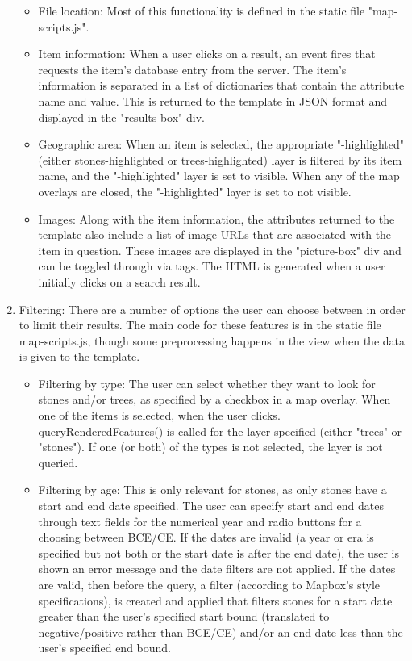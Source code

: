 \documentclass[]{article}
\begin{document}
\begin{enumerate}
		\begin{itemize}
			\item File location: Most of this functionality is defined in the static file "map-scripts.js". 
			\item Item information: When a user clicks on a result, an event fires that requests the item's database entry from the server. The item's information is separated in a list of dictionaries that contain the attribute name and value. This is returned to the template in JSON format and displayed in the "results-box" div. 
			\item Geographic area: When an item is selected, the appropriate "-highlighted" (either stones-highlighted or trees-highlighted) layer is filtered by its item name, and the "-highlighted" layer is set to visible. When any of the map overlays are closed, the "-highlighted" layer is set to not visible. 
			\item Images: Along with the item information, the attributes returned to the template also include a list of image URLs that are associated with the item in question. These images are displayed in the "picture-box" div and can be toggled through via tags. The HTML is generated when a user initially clicks on a search result. 
		\end{itemize}
	\item Filtering: There are a number of options the user can choose between in order to limit their results. The main code for these features is in the static file map-scripts.js, though some preprocessing happens in the view when the data is given to the template. 
		\begin{itemize}
			\item Filtering by type: The user can select whether they want to look for stones and/or trees, as specified by a checkbox in a map overlay. When one of the items is selected, when the user clicks. queryRenderedFeatures() is called for the layer specified (either "trees" or "stones"). If one (or both) of the types is not selected, the layer is not queried.  
			\item Filtering by age: This is only relevant for stones, as only stones have a start and end date specified. The user can specify start and end dates through text fields for the numerical year and radio buttons for a choosing between BCE/CE. If the dates are invalid (a year or era is specified but not both or the start date is after the end date), the user is shown an error message and the date filters are not applied. If the dates are valid, then before the query, a filter (according to Mapbox's style specifications), is created and applied that filters stones for a start date greater than the user's specified start bound (translated to negative/positive rather than BCE/CE) and/or an end date less than the user's specified end bound. 

\end{itemize}
\end{enumerate}
\end{document}
